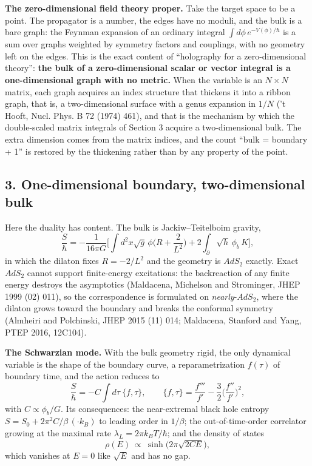 \documentclass[11pt,a4paper]{article}
\begin{document}
\textbf{The zero-dimensional field theory proper.} Take the target space
to be a point. The propagator is a number, the edges have no moduli, and
the bulk is a bare graph: the Feynman expansion of an ordinary integral
\(\int d\phi\,e^{-V(\phi)/\hbar}\) is a sum over graphs weighted by
symmetry factors and couplings, with no geometry left on the edges. This
is the exact content of ``holography for a zero-dimensional theory'':
\textbf{the bulk of a zero-dimensional scalar or vector integral is a
one-dimensional graph with no metric.} When the variable is an
\(N\times N\) matrix, each graph acquires an index structure that
thickens it into a ribbon graph, that is, a two-dimensional surface with
a genus expansion in \(1/N\) ('t Hooft, Nucl. Phys. B 72 (1974) 461),
and that is the mechanism by which the double-scaled matrix integrals of
Section 3 acquire a two-dimensional bulk. The extra dimension comes from
the matrix indices, and the count ``bulk = boundary + 1'' is restored by
the thickening rather than by any property of the point.

\hypertarget{one-dimensional-boundary-two-dimensional-bulk}{%
\subsection{3. One-dimensional boundary, two-dimensional
bulk}\label{one-dimensional-boundary-two-dimensional-bulk}}

Here the duality has content. The bulk is Jackiw--Teitelboim gravity,
\[\frac{S}{\hbar}=-\frac{1}{16\pi G}\Big[\int d^2x\sqrt g\,\phi\Big(R+\frac{2}{L^2}\Big)
+2\int_\partial\sqrt h\,\phi_b\,K\Big],\] in which the dilaton fixes
\(R=-2/L^2\) and the geometry is \(AdS_2\) exactly. Exact \(AdS_2\)
cannot support finite-energy excitations: the backreaction of any finite
energy destroys the asymptotics (Maldacena, Michelson and Strominger,
JHEP 1999 (02) 011), so the correspondence is formulated on
\emph{nearly}-\(AdS_2\), where the dilaton grows toward the boundary and
breaks the conformal symmetry (Almheiri and Polchinski, JHEP 2015 (11)
014; Maldacena, Stanford and Yang, PTEP 2016, 12C104).

\textbf{The Schwarzian mode.} With the bulk geometry rigid, the only
dynamical variable is the shape of the boundary curve, a
reparametrization \(f(\tau)\) of boundary time, and the action reduces
to \[\frac{S}{\hbar}=-C\int d\tau\ \{f,\tau\},\qquad
\{f,\tau\}=\frac{f'''}{f'}-\frac32\Big(\frac{f''}{f'}\Big)^2 ,\] with
\(C\propto\phi_b/G\). Its consequences: the near-extremal black hole
entropy \(S=S_0+2\pi^2C/\beta\,(\cdot k_B)\) to leading order in
\(1/\beta\); the out-of-time-order correlator growing at the maximal
rate \(\lambda_L=2\pi k_BT/\hbar\); and the density of states
\[\rho(E)\ \propto\ \sinh\Big(2\pi\sqrt{2CE}\Big),\] which vanishes at
\(E=0\) like \(\sqrt E\) and has no gap.
\end{document}
